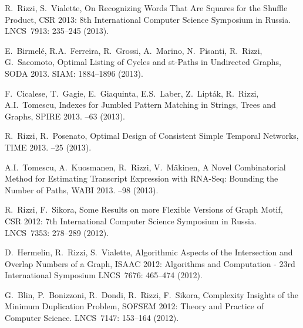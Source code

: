 \begin{etaremune}
  \item {R.~Rizzi, S.~Vialette},
   \newblock On Recognizing Words That Are Squares for the Shuffle Product,
   \newblock CSR 2013: 8th International Computer Science Symposium in Russia.
   \newblock LNCS~7913: 235--245 (2013).

  \item {E.~Birmel\'e, R.A.~Ferreira, R.~Grossi, A.~Marino, N.~Pisanti, R.~Rizzi, G.~Sacomoto},
   \newblock Optimal Listing of Cycles and st-Paths in Undirected Graphs,
   \newblock SODA 2013.
   \newblock SIAM: 1884--1896 (2013).

  \item {F.~Cicalese, T.~Gagie, E.~Giaquinta, E.S.~Laber, Z.~Lipt\'ak, R.~Rizzi, A.I.~Tomescu},
   \newblock Indexes for Jumbled Pattern Matching in Strings, Trees and Graphs,
   \newblock SPIRE 2013.
   --63 (2013).

  \item {R.~Rizzi, R.~Posenato},
   \newblock Optimal Design of Consistent Simple Temporal Networks,
   \newblock TIME 2013.
   --25 (2013).

  \item {A.I.~Tomescu, A.~Kuosmanen, R.~Rizzi, V.~M\"akinen},
   \newblock A Novel Combinatorial Method for Estimating Transcript Expression with RNA-Seq: Bounding the Number of Paths,
   \newblock WABI 2013.
   --98 (2013).

\vspace{-1.8mm}
  \item {R.~Rizzi, F.~Sikora},
   \newblock Some Results on more Flexible Versions of Graph Motif,
   \newblock CSR 2012: 7th International Computer Science Symposium in Russia.
   \newblock LNCS~7353: 278--289 (2012).

\vspace{-1.8mm}
  \item {D.~Hermelin, R.~Rizzi, S.~Vialette},
   \newblock Algorithmic Aspects of the Intersection and Overlap Numbers of a Graph,
   \newblock ISAAC 2012: Algorithms and Computation - 23rd International Symposium
   \newblock LNCS~7676: 465--474 (2012).

\vspace{-1.8mm}
  \item {G.~Blin, P.~Bonizzoni, R.~Dondi, R.~Rizzi, F.~Sikora},
   \newblock Complexity Insights of the Minimum Duplication Problem,
   \newblock SOFSEM 2012: Theory and Practice of Computer Science.
   \newblock LNCS~7147: 153--164 (2012).


\end{etaremune}
